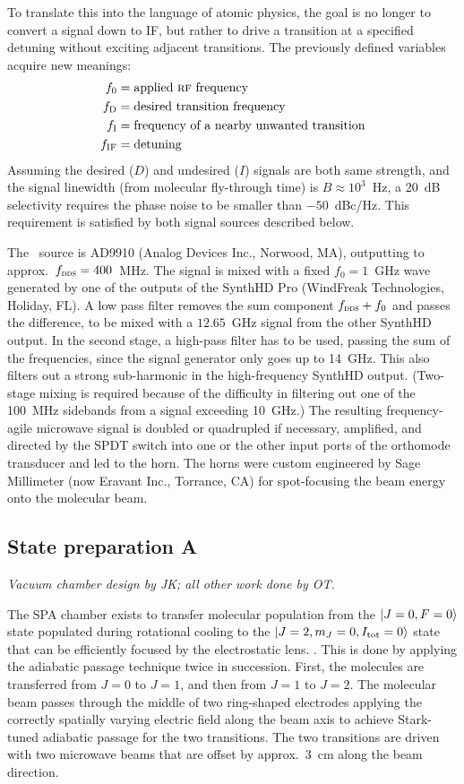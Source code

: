 To translate this into the language of atomic physics, the goal is no longer to
convert a signal down to IF, but rather to drive a transition at a specified
detuning without exciting adjacent transitions. The previously defined variables
acquire new meanings:
%
\begin{align*}
    f_0 &=\text{applied \textsc{rf}\ frequency}\\
    f_\text{D} &=\text{desired transition frequency}\\
    f_\text{I} &=\text{frequency of a nearby unwanted transition}\\
    f_\text{IF} &=\text{detuning}
\end{align*}
%
Assuming the desired ($D$) and undesired ($I$) signals are both same strength,
and the signal linewidth (from molecular fly-through time) is $B\approx10^3$~Hz,
a 20~dB selectivity requires the phase noise to be smaller than $-50$~dBc/Hz.
This requirement is satisfied by both signal sources described below.

The \DDS\ source is AD9910 (Analog Devices Inc., Norwood, MA), outputting to
approx.\ $f_\text{\textsc{dds}}=400$~MHz. The signal is mixed with a fixed $f_0=1$~GHz
wave generated by one of the outputs of the SynthHD Pro (WindFreak Technologies,
Holiday, FL). A low pass filter removes the sum component $f_\text{\textsc{dds}}+f_0$
and passes the difference, to be mixed with a $12.65$~GHz signal from the other
SynthHD output. In the second stage, a high-pass filter has to be used, passing
the sum of the frequencies, since the signal generator only goes up to 14~GHz.
This also filters out a strong sub-harmonic in the high-frequency SynthHD
output. (Two-stage mixing is required because of the difficulty in filtering out
one of the 100~MHz sidebands from a signal exceeding 10~GHz.) The resulting
frequency-agile microwave signal is doubled or quadrupled if necessary,
amplified, and directed by the SPDT switch into one or the other input ports of
the orthomode transducer and led to the horn. The horns were custom engineered
by Sage Millimeter (now Eravant Inc., Torrance, CA) for spot-focusing the beam
energy onto the molecular beam.

\subsection{State preparation A}

\textit{Vacuum chamber design by JK; all other work done by OT.}

The SPA chamber exists to transfer molecular population from the $|J=0,F=0\rangle$
state populated during rotational cooling to the
$|J=2,m_J=0,I_\text{tot}=0\rangle$ state that can be efficiently focused by the
electrostatic lens. \cite[ch.~7]{timgren2023thesis}. This is done by applying
the adiabatic passage technique \cite{treacy1968adiabatic} twice in succession.
First, the molecules are transferred from $J=0$ to $J=1$, and then from $J=1$ to
$J=2$. The molecular beam passes through the middle of two ring-shaped
electrodes applying the correctly spatially varying electric field along the
beam axis to achieve Stark-tuned adiabatic passage for the two transitions. The
two transitions are driven with two microwave beams that are offset by approx.\
3~cm along the beam direction.

